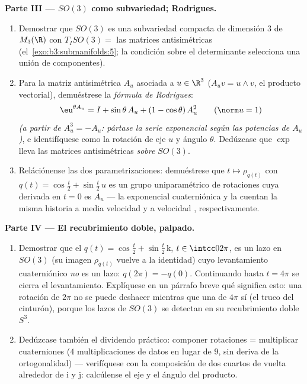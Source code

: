 \begin{problem}
\medskip
\noindent\textbf{Parte III --- $SO(3)$ como subvariedad; Rodrigues.}
\begin{enumerate}[resume]
  \item Demostrar que $SO(3)$ es una subvariedad
  compacta de dimensión $3$ de
  $M_3(\R)$ con $T_ISO(3) =$ las matrices antisimétricas
  (el~\cref{exo:b3:submanifolds:5}; la condición sobre el determinante
  selecciona una unión de componentes). \item Para la matriz
  antisimétrica $A_u$ asociada a $u \in \R^3$ ($A_uv = u\wedge v$, el
  producto vectorial), demuéstrese la \emph{fórmula de Rodrigues}:
        \[
        \eu^{\theta A_u} = I + \sin\theta\,A_u + (1 -
        \cos\theta)\,A_u^2 \qquad (\norm u = 1)
        \]
        \emph{(a partir de $A_u^3 = -A_u$: pártase la serie exponencial
        según las potencias de $A_u$)}, e identifíquese como la rotación
        de eje $u$ y ángulo $\theta$. Dedúzcase que $\exp$ lleva las
        matrices antisimétricas \emph{sobre}
        $SO(3)$.
  \item Relációnense las dos parametrizaciones: demuéstrese que $t
        \mapsto \rho_{q(t)}$ con $q(t) = \cos\frac t2 +
        \sin\frac t2\,u$ es un grupo uniparamétrico de rotaciones cuya
  derivada en $t = 0$ es $A_u$ --- la exponencial cuaterniónica y la
   cuentan la
  misma historia a media velocidad y a velocidad ,
  respectivamente.
\end{enumerate}

\medskip
\noindent\textbf{Parte IV --- El recubrimiento doble, palpado.}
\begin{enumerate}[resume]
  \item Demostrar que el 
  $q(t) = \cos\frac t2 + \sin\frac
        t2\,\mathrm k$, $t \in \intcc0{2\pi}$, es un lazo en $SO(3)$ (su
  imagen $\rho_{q(t)}$ vuelve a la identidad) cuyo levantamiento
  cuaterniónico \emph{no} es un lazo: $q(2\pi) = -q(0)$. Continuando
  hasta $t = 4\pi$ se cierra el levantamiento. Explíquese en un párrafo
  breve qué significa esto: una rotación de $2\pi$ no se puede deshacer
   mientras que una de
  $4\pi$ sí (el truco del cinturón), porque los lazos de $SO(3)$ se
  detectan en su recubrimiento doble $S^3$. \item Dedúzcase también el
  dividendo práctico: componer rotaciones = multiplicar cuaterniones
  ($4$ multiplicaciones de datos en lugar de $9$, sin deriva de la
  ortogonalidad) --- verifíquese con la composición de dos cuartos de
  vuelta alrededor de $\mathrm i$ y $\mathrm j$: calcúlense el eje y el
  ángulo del producto.
\end{enumerate}


\end{problem}
